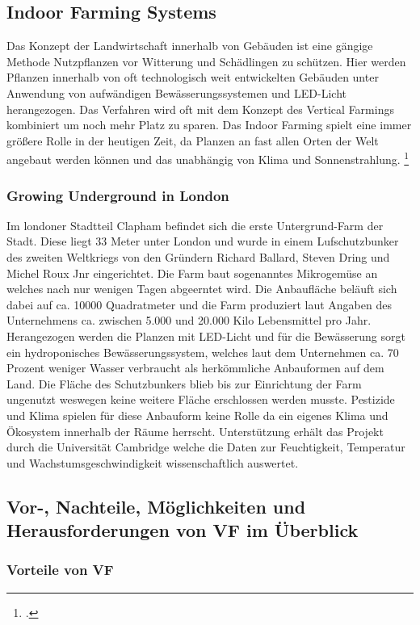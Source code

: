\documentclass{scrartcl}
\begin{document}
\subsection{Indoor Farming Systems}

Das Konzept der Landwirtschaft innerhalb von Gebäuden ist eine gängige Methode Nutzpflanzen vor Witterung und Schädlingen zu schützen. Hier werden Pflanzen innerhalb von oft technologisch weit entwickelten Gebäuden unter Anwendung von aufwändigen Bewässerungssystemen und LED-Licht herangezogen. Das Verfahren wird oft mit dem Konzept des Vertical Farmings kombiniert um noch mehr Platz zu sparen. Das Indoor Farming spielt eine immer größere Rolle in der heutigen Zeit, da Planzen an fast allen Orten der Welt angebaut werden können und das unabhängig von Klima und Sonnenstrahlung. \footcite[14.10.2018]{ACHTUNG}

\subsubsection{Growing Underground in London}

Im londoner Stadtteil Clapham befindet sich die erste Untergrund-Farm der Stadt. Diese liegt 33 Meter unter London und wurde in einem Lufschutzbunker des zweiten Weltkriegs von den Gründern  Richard Ballard, Steven Dring und Michel Roux Jnr eingerichtet. Die Farm baut sogenanntes Mikrogemüse an welches nach nur wenigen Tagen abgeerntet wird. Die Anbaufläche beläuft sich dabei auf ca. 10000 Quadratmeter und die Farm produziert laut Angaben des Unternehmens ca. zwischen 5.000 und 20.000 Kilo Lebensmittel pro Jahr. Herangezogen werden die Planzen mit LED-Licht und für die Bewässerung sorgt ein hydroponisches Bewässerungssystem, welches laut dem Unternehmen ca. 70 Prozent weniger Wasser verbraucht als herkömmliche Anbauformen auf dem Land. Die Fläche des Schutzbunkers blieb bis zur Einrichtung der Farm ungenutzt weswegen keine weitere Fläche erschlossen werden musste. Pestizide und Klima spielen für diese Anbauform keine Rolle da ein eigenes Klima und Ökosystem innerhalb der Räume herrscht. Unterstützung erhält das Projekt durch die Universität Cambridge welche die Daten zur Feuchtigkeit, Temperatur und Wachstumsgeschwindigkeit wissenschaftlich auswertet.

\subsection {Vor-, Nachteile, Möglichkeiten und Herausforderungen von VF im Überblick}
\subsubsection{Vorteile von VF}
\end{document}
